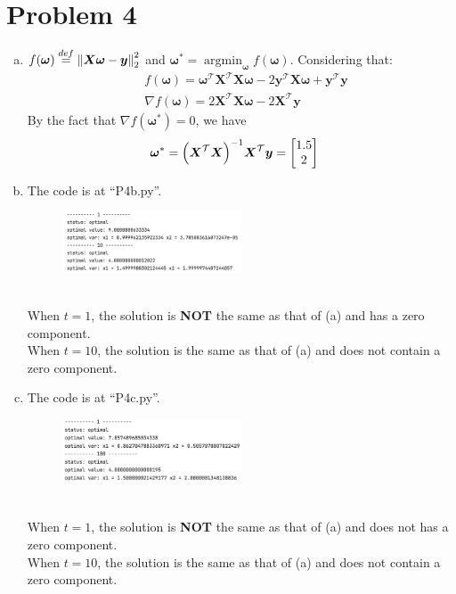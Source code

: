 \documentclass{article}
\def\Trsp#1{#1^{\mathcal{T}}}
\def\bw{\boldsymbol{\omega}}
\def\by{\boldsymbol{y}}
\def\bX{\boldsymbol{X}}
\begin{document}
\section*{Problem 4}
\begin{enumerate}[(a)]
	\item 
		$f(\bw)\stackrel{def}{=}\norm{\bX\bw-\by}_2^2$ and $\bw^*=\mathop{\arg\min}_{\bw}f(\bw)$. Considering that:
		$$
		\begin{aligned}
			&f(\bw)=\Trsp{\bw}\Trsp{\bX}\bX\bw
			-2\Trsp{\by}\bX\bw+\Trsp{\by}\by
			\\
			&\nabla f(\bw)=2\Trsp{\bX}\bX\bw
			-2\Trsp{\bX}\by
		\end{aligned}
		$$
		By the fact that $\nabla f(\bw^*)=0$, we have
		$$
		\begin{aligned}
			\bw^*&=\qty(\Trsp{\bX}\bX)^{-1}\Trsp{\bX}\by=\mqty[1.5\\2]
		\end{aligned}
		$$
	\item
		The code is at ``P4b.py''.
		\begin{figure}[h]
			\centering
			\includegraphics[width=0.5\textwidth]{p4b.png}
		\end{figure}
		\\
		When $t=1$, the solution is \textbf{NOT} the same as that of (a) and has a zero component.
		\\
		When $t=10$, the solution is the same as that of (a) and does not contain a zero component.

	\item
		The code is at ``P4c.py''.
		\begin{figure}[h]
			\centering
			\includegraphics[width=0.5\textwidth]{p4c.png}
		\end{figure}
		\\
		When $t=1$, the solution is \textbf{NOT} the same as that of (a) and does not has a zero component.
		\\
		When $t=10$, the solution is the same as that of (a) and does not contain a zero component.

\end{enumerate}
\end{document}
